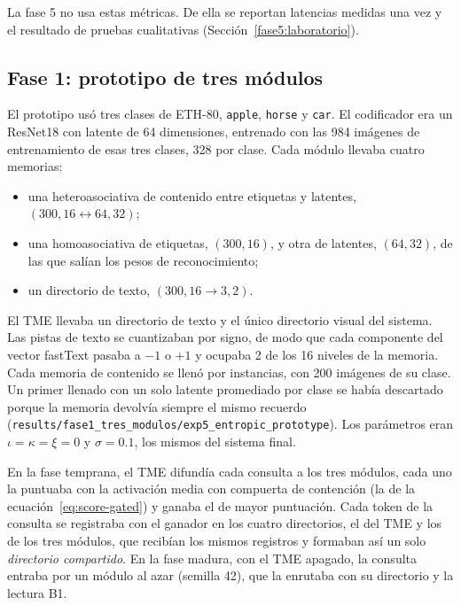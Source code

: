 La fase 5 no usa estas métricas.
De ella se reportan latencias medidas una vez y el resultado de pruebas cualitativas
(Sección~\ref{fase5:laboratorio}).

\subsection{Fase 1: prototipo de tres módulos}
\label{fase1:prototipo}

El prototipo usó tres clases de ETH-80, \texttt{apple}, \texttt{horse} y \texttt{car}.
El codificador era un ResNet18 con latente de 64 dimensiones, entrenado con las 984
imágenes de entrenamiento de esas tres clases, 328 por clase.
Cada módulo llevaba cuatro memorias:
\begin{itemize}
    \item una heteroasociativa de contenido entre etiquetas y latentes,
    $(300, 16 \leftrightarrow 64, 32)$;
    \item una homoasociativa de etiquetas, $(300, 16)$, y otra de latentes, $(64, 32)$,
    de las que salían los pesos de reconocimiento;
    \item un directorio de texto, $(300, 16 \to 3, 2)$.
\end{itemize}
El TME llevaba un directorio de texto y el único directorio visual del sistema.
Las pistas de texto se cuantizaban por signo, de modo que cada componente del vector
fastText pasaba a $-1$ o $+1$ y ocupaba 2 de los 16 niveles de la memoria.
Cada memoria de contenido se llenó por instancias, con 200 imágenes de su clase.
Un primer llenado con un solo latente promediado por clase se había descartado porque
la memoria devolvía siempre el mismo recuerdo
(\texttt{results/fase1\_tres\_modulos/exp5\_entropic\_prototype}).
Los parámetros eran $\iota = \kappa = \xi = 0$ y $\sigma = 0.1$, los mismos del sistema
final.

En la fase temprana, el TME difundía cada consulta a los tres módulos, cada uno la
puntuaba con la activación media con compuerta de contención (la de la
ecuación~\eqref{eq:score-gated}) y ganaba el de mayor puntuación.
Cada token de la consulta se registraba con el ganador en los cuatro directorios, el
del TME y los de los tres módulos, que recibían los mismos registros y formaban así un
solo \emph{directorio compartido}.
En la fase madura, con el TME apagado, la consulta entraba por un módulo al azar
(semilla 42), que la enrutaba con su directorio y la lectura B1.

